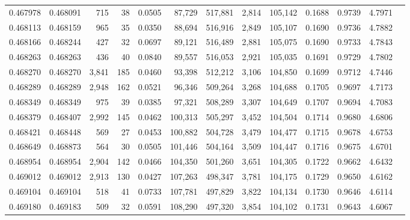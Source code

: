 \begin{tabular}{rrrrrrrrrrrrr}
0.467978 & 0.468091 &   715 &    38 &                                     0.0505 &  87,729 & 517,881 &   2,814 & 105,142 & 0.1688 & 0.9739 & 4.7971 \\
0.468113 & 0.468159 &   965 &    35 &                                     0.0350 &  88,694 & 516,916 &   2,849 & 105,107 & 0.1690 & 0.9736 & 4.7882 \\
0.468166 & 0.468244 &   427 &    32 &                                     0.0697 &  89,121 & 516,489 &   2,881 & 105,075 & 0.1690 & 0.9733 & 4.7843 \\
0.468263 & 0.468263 &   436 &    40 &                                     0.0840 &  89,557 & 516,053 &   2,921 & 105,035 & 0.1691 & 0.9729 & 4.7802 \\
0.468270 & 0.468270 & 3,841 &   185 &                                     0.0460 &  93,398 & 512,212 &   3,106 & 104,850 & 0.1699 & 0.9712 & 4.7446 \\
0.468289 & 0.468289 & 2,948 &   162 &                                     0.0521 &  96,346 & 509,264 &   3,268 & 104,688 & 0.1705 & 0.9697 & 4.7173 \\
0.468349 & 0.468349 &   975 &    39 &                                     0.0385 &  97,321 & 508,289 &   3,307 & 104,649 & 0.1707 & 0.9694 & 4.7083 \\
0.468379 & 0.468407 & 2,992 &   145 &                                     0.0462 & 100,313 & 505,297 &   3,452 & 104,504 & 0.1714 & 0.9680 & 4.6806 \\
0.468421 & 0.468448 &   569 &    27 &                                     0.0453 & 100,882 & 504,728 &   3,479 & 104,477 & 0.1715 & 0.9678 & 4.6753 \\
0.468649 & 0.468873 &   564 &    30 &                                     0.0505 & 101,446 & 504,164 &   3,509 & 104,447 & 0.1716 & 0.9675 & 4.6701 \\
0.468954 & 0.468954 & 2,904 &   142 &                                     0.0466 & 104,350 & 501,260 &   3,651 & 104,305 & 0.1722 & 0.9662 & 4.6432 \\
0.469012 & 0.469012 & 2,913 &   130 &                                     0.0427 & 107,263 & 498,347 &   3,781 & 104,175 & 0.1729 & 0.9650 & 4.6162 \\
0.469104 & 0.469104 &   518 &    41 &                                     0.0733 & 107,781 & 497,829 &   3,822 & 104,134 & 0.1730 & 0.9646 & 4.6114 \\
0.469180 & 0.469183 &   509 &    32 &                                     0.0591 & 108,290 & 497,320 &   3,854 & 104,102 & 0.1731 & 0.9643 & 4.6067 \\

\end{tabular}
